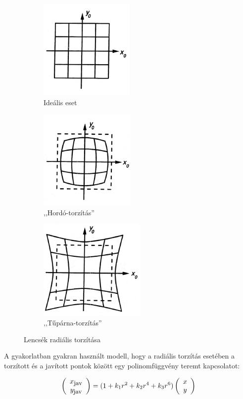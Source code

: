 \begin{figure}[tbh]
\centering
\begin{subfigure}[b]{.32\linewidth}
	\centering
	\includegraphics{figures/dist-1.png}
	\caption{Ideális eset}
  \end{subfigure}
\begin{subfigure}[b]{.32\linewidth}
	\centering
	\includegraphics{figures/dist-2.png}
	\caption{,,Hordó-torzítás''}
  \end{subfigure}
\begin{subfigure}[b]{.32\linewidth}
	\centering
	\includegraphics{figures/dist-3.png}
	\caption{,,Tűpárna-torzítás''}
  \end{subfigure}
\caption{Lencsék radiális torzítása \cite{distortion} \label{fig:radial-distortion}}
\end{figure}

A gyakorlatban gyakran használt modell, hogy a radiális torzítás esetében a torzított és a javított pontok között egy polinomfüggvény teremt kapcsolatot:

\[\left(\begin{array}{c}x_{\hbox{\small jav}}\\ y_{\hbox{\small jav}}\end{array}\right) = (1 + k_1r^2 + k_2r^4 + k_3r^6) \left(\begin{array}{c}x\\y\end{array}\right)\]

